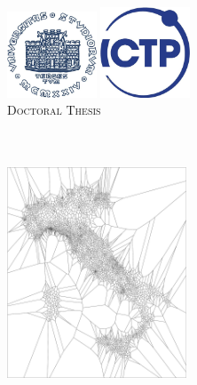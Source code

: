 \begin{titlepage}
\begin{center}

\vspace*{.04\textheight}
{\scshape\LARGE \univname\par}\vspace{.5cm} %
\includegraphics[width=0.2\textwidth]{figures/logos/logosfondoBIG}\hspace{2cm}
\includegraphics[width=0.2\textwidth]{figures/logos/ICTPLogo}\\
\vspace{.5cm}
\textsc{\Large Doctoral Thesis}\\[0.5cm] %

\HRule \\[0.4cm] %
{\huge \bfseries \ttitle\par}\vspace{0.3cm} %
\HRule \\[.6cm] %

    \includegraphics[width=0.4\textwidth]{figures/voronoi}


\end{center}
\end{titlepage}
